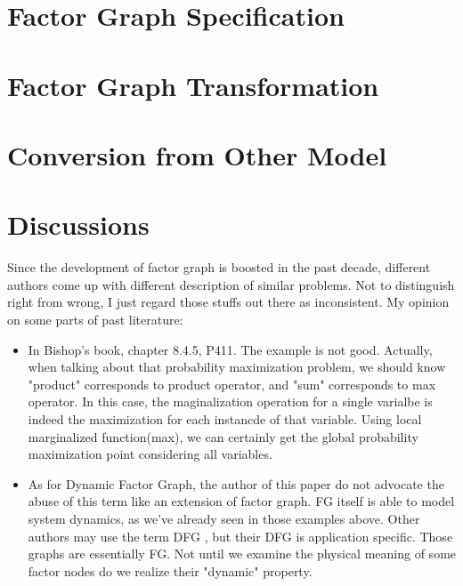 \documentclass[11pt,a4paper]{article}
\begin{document}
\section{Factor Graph Specification}


\section{Factor Graph Transformation}



\section{Conversion from Other Model}



\section{Discussions}

Since the development of factor graph is boosted in the past decade, 
different authors come up with different description of similar problems. 
Not to distinguish right from wrong, I just regard those stuffs out there
as inconsistent. My opinion on some parts of past literature:
\begin{itemize}
	\item In Bishop's book\cite{bishop2006pattern}, chapter 8.4.5, P411. 
	The example is not good. Actually, when talking about that probability 
	maximization problem, we should know "product" corresponds to product operator, 
	and "sum" corresponds to max operator. In this case, the maginalization 
	operation for a single varialbe is indeed the maximization for each 
	instancde of that variable. Using local marginalized function(max), we 
	can certainly get the global probability maximization point considering
	all variables. 
	\item As for Dynamic Factor Graph, the author of this paper do not advocate 
	the abuse of this term like an extension of factor graph. FG itself is able 
	to model system dynamics, as we've already seen in those examples above. 
	Other authors may use the term DFG
\cite{wang2011-dynamic}
\cite{mirowski2009dynamic}
	, but their DFG is application specific. 
	Those graphs are essentially FG. Not until we examine the physical meaning of 
	some factor nodes do we realize their "dynamic" property. 
\end{itemize}



\end{document}
